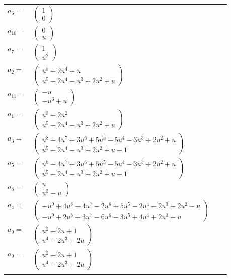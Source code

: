 \documentclass[1p]{elsarticle_modified}
\theoremstyle{definition}
\begin{document}
\begin{tabular}{m{7pt} m{180pt} m{7pt} m{180pt} }
\flushright $a_{6}=$&$\begin{pmatrix}1\\0\end{pmatrix}$ \\
\flushright $a_{10}=$&$\begin{pmatrix}0\\u\end{pmatrix}$ \\
\flushright $a_{7}=$&$\begin{pmatrix}1\\u^2\end{pmatrix}$ \\
\flushright $a_{2}=$&$\begin{pmatrix}u^5-2 u^4+u\\u^5-2 u^4- u^3+2 u^2+u\end{pmatrix}$ \\
\flushright $a_{11}=$&$\begin{pmatrix}- u\\- u^3+u\end{pmatrix}$ \\
\flushright $a_{1}=$&$\begin{pmatrix}u^3-2 u^2\\u^5-2 u^4- u^3+2 u^2+u\end{pmatrix}$ \\
\flushright $a_{3}=$&$\begin{pmatrix}u^8-4 u^7+3 u^6+5 u^5-5 u^4-3 u^3+2 u^2+u\\u^5-2 u^4- u^3+2 u^2+u-1\end{pmatrix}$ \\
\flushright $a_{5}=$&$\begin{pmatrix}u^8-4 u^7+3 u^6+5 u^5-5 u^4-3 u^3+2 u^2+u\\u^5-2 u^4- u^3+2 u^2+u-1\end{pmatrix}$ \\
\flushright $a_{8}=$&$\begin{pmatrix}u\\u^3- u\end{pmatrix}$ \\
\flushright $a_{4}=$&$\begin{pmatrix}- u^9+4 u^8-4 u^7-2 u^6+5 u^5-2 u^4-2 u^3+2 u^2+u\\- u^9+2 u^8+3 u^7-6 u^6-3 u^5+4 u^4+2 u^3+u\end{pmatrix}$ \\
\flushright $a_{9}=$&$\begin{pmatrix}u^2-2 u+1\\u^4-2 u^3+2 u\end{pmatrix}$\\ \flushright $a_{9}=$&$\begin{pmatrix}u^2-2 u+1\\u^4-2 u^3+2 u\end{pmatrix}$\\&\end{tabular}
\end{document}

